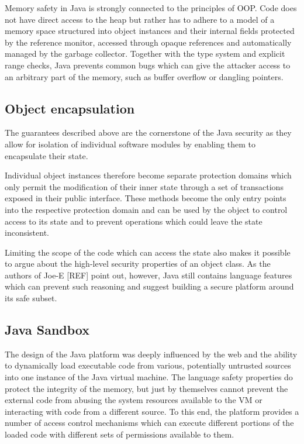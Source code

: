 \documentclass[a4paper,12pt,twoside,openright]{report}
\begin{document}
Memory safety in Java is strongly connected to the principles of OOP. Code does not have direct access to the heap but rather has to adhere to a model of a memory space structured into object instances and their internal fields protected by the reference monitor, accessed through opaque references and automatically managed by the garbage collector. Together with the type system and explicit range checks, Java prevents common bugs which can give the attacker access to an arbitrary part of the memory, such as buffer overflow or dangling pointers.

\subsection{Object encapsulation}

The guarantees described above are the cornerstone of the Java security as they allow for isolation of individual software modules by enabling them to encapsulate their state. 

Individual object instances therefore become separate protection domains which only permit the modification of their inner state through a set of transactions exposed in their public interface. These methods become the only entry points into the respective protection domain and can be used by the object to control access to its state and to prevent operations which could leave the state inconsistent.

Limiting the scope of the code which can access the state also makes it possible to argue about the high-level security properties of an object class. As the authors of Joe-E [REF] point out, however, Java still contains language features which can prevent such reasoning and suggest building a secure platform around its safe subset.

\subsection{Java Sandbox}

The design of the Java platform was deeply influenced by the web and the ability to dynamically load executable code from various, potentially untrusted sources into one instance of the Java virtual machine. The language safety properties do protect the integrity of the memory, but just by themselves cannot prevent the external code from abusing the system resources available to the VM or interacting with code from a different source. To this end, the platform provides a number of access control mechanisms which can execute different portions of the loaded code with different sets of permissions available to them.
\end{document}
